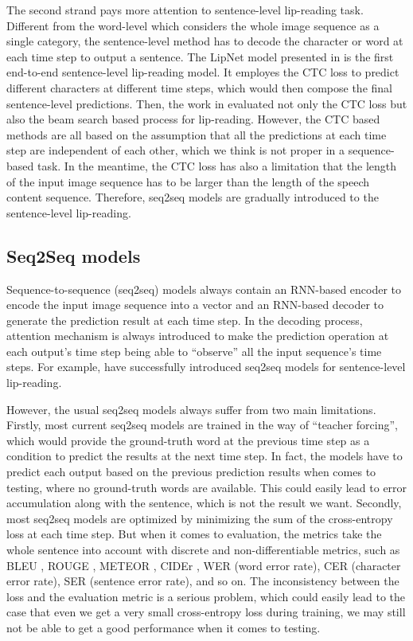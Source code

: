 \documentclass[a4paper, 10pt, conference]{ieeeconf}      \usepackage{FG2020}
\begin{document}
The second strand pays more attention to sentence-level lip-reading task. Different from the word-level which considers the whole image sequence as a single category, the sentence-level method has to decode the character or word at each time step to output a sentence. The LipNet model presented in \cite{Assael2016} is the first end-to-end sentence-level lip-reading model. It employes the CTC loss to predict different characters at different time steps, which would then compose the final sentence-level predictions. Then, the work in \cite{Afouras} evaluated not only the CTC loss but also the beam search based process \cite{Wiseman2016} for lip-reading. However, the CTC based methods are all based on the assumption that all the predictions at each time step are independent of each other, which we think is not proper in a sequence-based task. In the meantime, the CTC loss has also a limitation that the length of the input image sequence has to be larger than the length of the speech content sequence. Therefore, seq2seq models are gradually introduced to the sentence-level lip-reading.


\subsection{Seq2Seq models}
Sequence-to-sequence (seq2seq) models always contain an RNN-based encoder to encode the input image sequence into a vector and an RNN-based decoder to generate the prediction result at each time step. 
In the decoding process, attention mechanism is always introduced to make the prediction operation at each output's time step being able to ``observe'' all the input sequence's time steps. 
For example, \cite{Chung, Chung2017, Afouras2018} have successfully introduced seq2seq models for sentence-level lip-reading.

However, the usual seq2seq models always suffer from two main limitations.
Firstly, most current seq2seq models are trained in the way of ``teacher forcing'', which would provide the ground-truth word at the previous time step as a condition to predict the results at the next time step. In fact, the models have to predict each output based on the previous prediction results when comes to testing, where no ground-truth words are available.
This could easily lead to error accumulation along with the sentence, which is not the result we want.
Secondly, most seq2seq models are optimized by minimizing the sum of the cross-entropy loss at each time step. But when it comes to evaluation, the metrics take the whole sentence into account with discrete and non-differentiable metrics, such as BLEU \cite{Papineni2002}, ROUGE \cite{Lin2001}, METEOR \cite{Banerjee2003}, CIDEr \cite{Tech}, WER (word error rate), CER (character error rate), SER (sentence error rate), and so on. The inconsistency between the loss and the evaluation metric is a serious problem, which could easily lead to the case that even we get a very small cross-entropy loss during training, we may still not be able to get a good performance when it comes to testing. 
\end{document}
